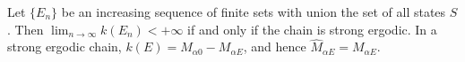 Let $\{E_n\}$ be an increasing sequence of finite sets with union the set of all states $S$. Then $\lim_{n \to \infty} k(E_n) < +\infty$ if and only if the chain is strong ergodic. In a strong ergodic chain, $k(E) = M_{\alpha 0} - M_{\alpha E}$, and hence $\hat{M}_{\alpha E} = M_{\alpha E}$.
